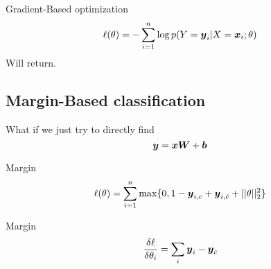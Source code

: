 \documentclass{beamer}
\begin{document}
\begin{frame}{Gradient-Based optimization}
  \[ \ell(\theta) = - \sum_{i=1}^n \log p(Y = \boldsymbol{y}_i | X = \boldsymbol{x}_i; \theta) \] 
  Will return.
\end{frame}

\subsection{Margin-Based classification}
\begin{frame}{}
  What if we just try to directly find 
     \[\boldsymbol{y} = \boldsymbol{x} \boldsymbol{W} + \boldsymbol{b}\]   
    
\end{frame}


\begin{frame}{Margin}
    \[ \ell(\theta) = \sum_{i=1}^n \max\{0, 1 - \boldsymbol{y}_{i,c} + \boldsymbol{y}_{i, \hat{c}} + ||\theta||^2_2\} \]
\end{frame}


\begin{frame}{Margin}
  \[\frac{\delta \ell}{\delta \theta_i} = \sum_i \boldsymbol{y}_i - \boldsymbol{y}_{\hat{c}}  \]
\end{frame}
\end{document}
